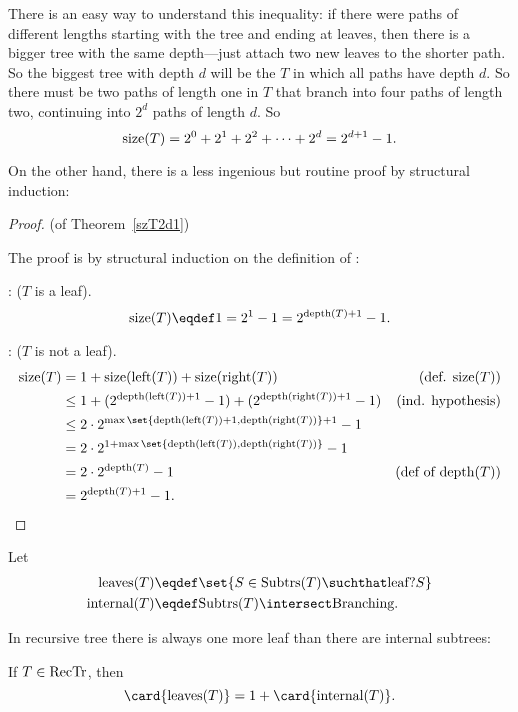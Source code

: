 There is an easy way to understand this inequality: if there were
paths of different lengths starting with the tree and ending at
leaves, then there is a bigger tree with the same depth---just attach
two new leaves to the shorter path.  So the biggest tree with depth
$d$ will be the  $T$ in which all paths have depth
$d$.  So there must be two paths of length one in $T$ that branch into
four paths of length two, continuing into $2^d$ paths of length $d$.
So
\[
\text{size}(T) = 2^0 + 2^1 + 2^2 + \cdots + 2^d = 2^{d+1}-1.
\]

On the other hand, there is a less ingenious but routine proof by
structural induction:
\begin{proof} (of Theorem~\ref{szT2d1})

The proof is by structural induction on the definition of \rectr:

: ($T$ is a leaf).
\[
\sizetr{T} \eqdef 1 = 2^1 - 1 = 2^{\trdpth{T}+1} - 1.
\]

: ($T$ is not a leaf).
\begin{align*}
\sizetr{T}
& = 1 + \sizetr{\leftsub{(T)}} + \sizetr{\rightsub{(T)}}
              & \text{(def. $\sizetr{T}$)}\\
& \leq 1 + (2^{\trdpth{\leftsub{(T)}}+1} -1)  + (2^{\trdpth{\rightsub{(T)}}+1} -1)
              & \text{(ind. hypothesis)}\\
& \leq  2\cdot 2^{\max\set{\trdpth{\leftsub{(T)}}+1,\trdpth{\rightsub{(T)}}}+1} - 1\\
& = 2\cdot 2^{1+\max\set{\trdpth{\leftsub{(T)}},\trdpth{\rightsub{(T)}}}} - 1\\
& = 2\cdot 2^{\trdpth{T}} - 1
              & \text{(def of $\trdpth{T}$)}\\
& =  2^{\trdpth{T}+1} - 1.
\end{align*}
\end{proof}

Let
\begin{align*}
\text{leaves}(T)   & \eqdef \set{S \in \subbrn{T} \suchthat \leafp{S}}\\
\text{internal}(T) & \eqdef \subbrn{T} \intersect \brnchng.
\end{align*}

In recursive tree there is always one more leaf than there are
internal subtrees:

\begin{lemma}\label{}
If $T \in \text{RecTr}$, then
\[
\card{\text{leaves}(T)} = 1 + \card{\text{internal}(T)}.
\]
\end{lemma}

